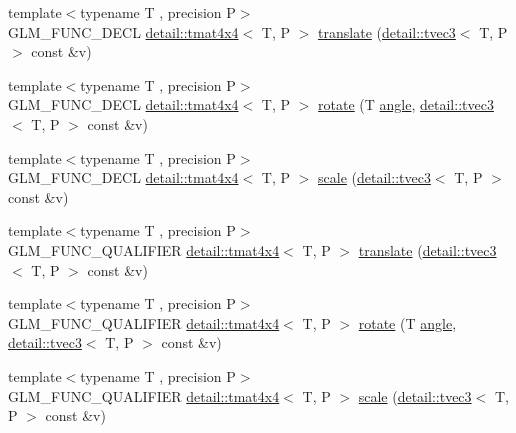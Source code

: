 \begin{DoxyCompactItemize}
\item 
{\footnotesize template$<$typename T , precision P$>$ }\\G\+L\+M\+\_\+\+F\+U\+N\+C\+\_\+\+D\+E\+CL \hyperlink{structglm_1_1detail_1_1tmat4x4}{detail\+::tmat4x4}$<$ T, P $>$ \hyperlink{group__gtx__transform_ga8a2efce0917bf301cc0ea7afb428f688}{translate} (\hyperlink{structglm_1_1detail_1_1tvec3}{detail\+::tvec3}$<$ T, P $>$ const \&v)
\item 
{\footnotesize template$<$typename T , precision P$>$ }\\G\+L\+M\+\_\+\+F\+U\+N\+C\+\_\+\+D\+E\+CL \hyperlink{structglm_1_1detail_1_1tmat4x4}{detail\+::tmat4x4}$<$ T, P $>$ \hyperlink{group__gtx__transform_gaac4ccdbf699a62fe6429005512c0cda5}{rotate} (T \hyperlink{group__gtc__quaternion_ga23a3fc7ada5bbb665ff84c92c6e0542c}{angle}, \hyperlink{structglm_1_1detail_1_1tvec3}{detail\+::tvec3}$<$ T, P $>$ const \&v)
\item 
{\footnotesize template$<$typename T , precision P$>$ }\\G\+L\+M\+\_\+\+F\+U\+N\+C\+\_\+\+D\+E\+CL \hyperlink{structglm_1_1detail_1_1tmat4x4}{detail\+::tmat4x4}$<$ T, P $>$ \hyperlink{group__gtx__transform_ga80eb26a1eb382b7ab1e3631532d21103}{scale} (\hyperlink{structglm_1_1detail_1_1tvec3}{detail\+::tvec3}$<$ T, P $>$ const \&v)
\item 
{\footnotesize template$<$typename T , precision P$>$ }\\G\+L\+M\+\_\+\+F\+U\+N\+C\+\_\+\+Q\+U\+A\+L\+I\+F\+I\+ER \hyperlink{structglm_1_1detail_1_1tmat4x4}{detail\+::tmat4x4}$<$ T, P $>$ \hyperlink{group__gtx__transform_ga8a2efce0917bf301cc0ea7afb428f688}{translate} (\hyperlink{structglm_1_1detail_1_1tvec3}{detail\+::tvec3}$<$ T, P $>$ const \&v)
\item 
{\footnotesize template$<$typename T , precision P$>$ }\\G\+L\+M\+\_\+\+F\+U\+N\+C\+\_\+\+Q\+U\+A\+L\+I\+F\+I\+ER \hyperlink{structglm_1_1detail_1_1tmat4x4}{detail\+::tmat4x4}$<$ T, P $>$ \hyperlink{group__gtx__transform_gaac4ccdbf699a62fe6429005512c0cda5}{rotate} (T \hyperlink{group__gtc__quaternion_ga23a3fc7ada5bbb665ff84c92c6e0542c}{angle}, \hyperlink{structglm_1_1detail_1_1tvec3}{detail\+::tvec3}$<$ T, P $>$ const \&v)
\item 
{\footnotesize template$<$typename T , precision P$>$ }\\G\+L\+M\+\_\+\+F\+U\+N\+C\+\_\+\+Q\+U\+A\+L\+I\+F\+I\+ER \hyperlink{structglm_1_1detail_1_1tmat4x4}{detail\+::tmat4x4}$<$ T, P $>$ \hyperlink{group__gtx__transform_ga80eb26a1eb382b7ab1e3631532d21103}{scale} (\hyperlink{structglm_1_1detail_1_1tvec3}{detail\+::tvec3}$<$ T, P $>$ const \&v)

\end{DoxyCompactItemize}
